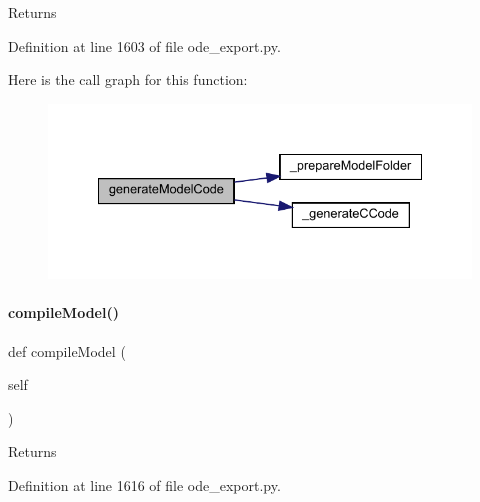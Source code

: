\begin{DoxyReturn}{Returns}

\end{DoxyReturn}


Definition at line 1603 of file ode\+\_\+export.\+py.

Here is the call graph for this function\+:
\nopagebreak
\begin{figure}[H]
\begin{center}
\leavevmode
\includegraphics[width=334pt]{classamici_1_1ode__export_1_1_o_d_e_exporter_a3ec6677c764c1a2d57a51d8a9f468310_cgraph}
\end{center}
\end{figure}
\mbox{\label{classamici_1_1ode__export_1_1_o_d_e_exporter_a61bf03049b9989d73b584fbca9f8d499}} 
\paragraph{\texorpdfstring{compile\+Model()}{compileModel()}}
{\footnotesize\ttfamily def compile\+Model (\begin{DoxyParamCaption}\item[{}]{self }\end{DoxyParamCaption})}

\begin{DoxyReturn}{Returns}

\end{DoxyReturn}


Definition at line 1616 of file ode\+\_\+export.\+py.

